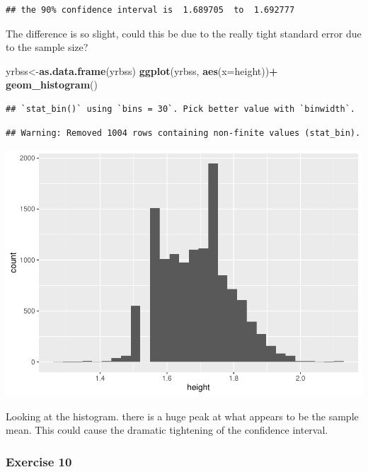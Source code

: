\documentclass[
]{article}
\newenvironment{Shaded}{\begin{snugshade}}{\end{snugshade}}
\newcommand{\DataTypeTok}[1]{\textcolor[rgb]{0.13,0.29,0.53}{#1}}
\newcommand{\KeywordTok}[1]{\textcolor[rgb]{0.13,0.29,0.53}{\textbf{#1}}}
\newcommand{\NormalTok}[1]{#1}
\newcommand{\OperatorTok}[1]{\textcolor[rgb]{0.81,0.36,0.00}{\textbf{#1}}}
\newcommand{\StringTok}[1]{\textcolor[rgb]{0.31,0.60,0.02}{#1}}
\begin{document}
\begin{verbatim}
## the 90% confidence interval is  1.689705  to  1.692777
\end{verbatim}

The difference is so slight, could this be due to the really tight
standard error due to the sample size?

\begin{Shaded}
\begin{Highlighting}[]
\NormalTok{yrbss<-}\KeywordTok{as.data.frame}\NormalTok{(yrbss)}
\KeywordTok{ggplot}\NormalTok{(yrbss, }\KeywordTok{aes}\NormalTok{(}\DataTypeTok{x=}\NormalTok{height))}\OperatorTok{+}
\StringTok{  }\KeywordTok{geom_histogram}\NormalTok{()}
\end{Highlighting}
\end{Shaded}

\begin{verbatim}
## `stat_bin()` using `bins = 30`. Pick better value with `binwidth`.
\end{verbatim}

\begin{verbatim}
## Warning: Removed 1004 rows containing non-finite values (stat_bin).
\end{verbatim}

\includegraphics{lab_7_files/figure-latex/unnamed-chunk-15-1.pdf}

Looking at the histogram. there is a huge peak at what appears to be the
sample mean. This could cause the dramatic tightening of the confidence
interval.

\hypertarget{exercise-10}{%
\subsubsection{Exercise 10}\label{exercise-10}}
\end{document}
